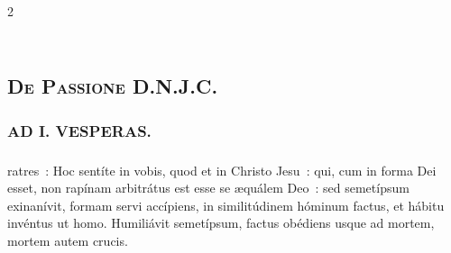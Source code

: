 \documentclass[9pt,twoside]{extarticle}
\begin{document}
\begin{multicols}{2}
{{\subsection*{\center {}}
\subsection*{\center \textsc{\\ De Passione D.N.J.C.}}
\subsubsection*{\center {}}

\subsubsection*{\center \textsc{AD I. VESPERAS.}}
\subsubsection*{}
ratres~: Hoc sentíte in vobis, quod et in Christo Jesu~: qui, cum in forma Dei esset, non rapínam arbitrátus est esse se æquálem Deo~: sed semetípsum exinanívit, formam servi accípiens, in similitúdinem hóminum factus, et hábitu invéntus ut homo. Humiliávit semetípsum, factus obédiens usque ad mortem, mortem autem crucis.

}}
\end{multicols}
\end{document}
